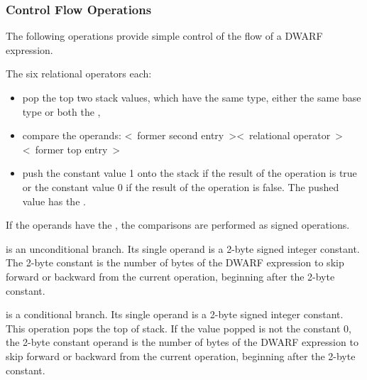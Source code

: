 \subsubsection{Control Flow Operations}
\label{chap:controlflowoperations}
The 
following operations provide simple control of the flow of a DWARF expression.
\begin{enumerate}[1. ]
\itembfnl{\DWOPleTARG, \DWOPgeTARG, \DWOPeqTARG, \DWOPltTARG, \DWOPgtTARG, \DWOPneTARG}
The six relational operators each:
\begin{itemize}
\item pop the top two stack values, which \bb\eb have the same type,
either the same base type or both the \specialaddresstype, 

\item compare the operands:
\linebreak
\textless~former second entry~\textgreater  \textless~relational operator~\textgreater \textless~former top entry~\textgreater

\item push the constant value 1 onto the stack 
if the result of the operation is true or the
constant value 0 if the result of the operation is false.
The pushed value has the \specialaddresstype.
\end{itemize}

If the operands have the \specialaddresstype, the comparisons  
are performed as signed operations.

\itembfnl{\DWOPskipTARG}
\DWOPskipNAME{} is an unconditional branch. Its single operand
is a 2-byte signed integer constant. The 2-byte constant is
the number of bytes of the DWARF expression to skip forward
or backward from the current operation, beginning after the
2-byte constant.

\itembfnl{\DWOPbraTARG}
\DWOPbraNAME{} is a conditional branch. Its single operand is a
2-byte signed integer constant.  This operation pops the
top of stack. If the value popped is not the constant 0,
the 2-byte constant operand is the number of bytes of the
DWARF expression to skip forward or backward from the current
operation, beginning after the 2-byte constant.


\end{enumerate}
